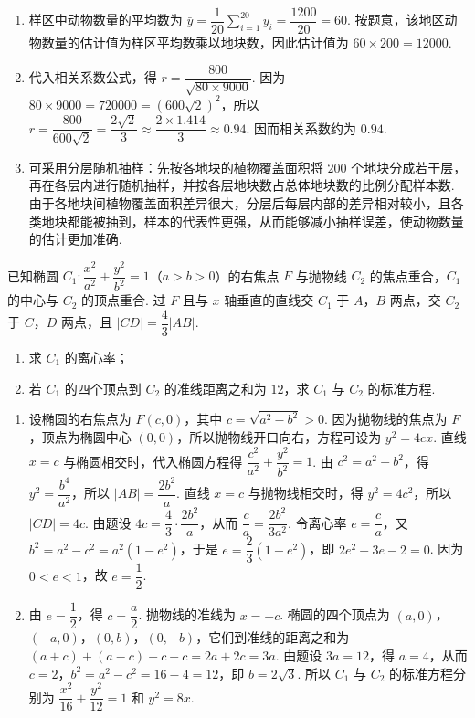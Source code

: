 \begin{solution}
\begin{enumerate}
\item 样区中动物数量的平均数为 \(\bar y=\dfrac1{20}\sum_{i=1}^{20}y_i=\dfrac{1200}{20}=60\). 按题意，该地区动物数量的估计值为样区平均数乘以地块数，因此估计值为 \(60\times200=12000\).
\item 代入相关系数公式，得 \(r=\dfrac{800}{\sqrt{80\times9000}}\). 因为 \(80\times9000=720000=(600\sqrt2)^2\)，所以 \(r=\dfrac{800}{600\sqrt2}=\dfrac{2\sqrt2}{3}\approx\dfrac{2\times1.414}{3}\approx0.94\). 因而相关系数约为 \(0.94\).
\item 可采用分层随机抽样：先按各地块的植物覆盖面积将 \(200\) 个地块分成若干层，再在各层内进行随机抽样，并按各层地块数占总体地块数的比例分配样本数. 由于各地块间植物覆盖面积差异很大，分层后每层内部的差异相对较小，且各类地块都能被抽到，样本的代表性更强，从而能够减小抽样误差，使动物数量的估计更加准确.
\end{enumerate}
\end{solution}

\begin{problem}
已知椭圆 \(C_1:\dfrac{x^2}{a^2}+\dfrac{y^2}{b^2}=1\)（\(a>b>0\)）的右焦点 \(F\) 与抛物线 \(C_2\) 的焦点重合，\(C_1\) 的中心与 \(C_2\) 的顶点重合. 过 \(F\) 且与 \(x\) 轴垂直的直线交 \(C_1\) 于 \(A\)，\(B\) 两点，交 \(C_2\) 于 \(C\)，\(D\) 两点，且 \(\lvert CD\rvert=\dfrac{4}{3}\lvert AB\rvert\).

\begin{enumerate}
\item 求 \(C_1\) 的离心率；
\item 若 \(C_1\) 的四个顶点到 \(C_2\) 的准线距离之和为 \(12\)，求 \(C_1\) 与 \(C_2\) 的标准方程.
\end{enumerate}
\end{problem}

\begin{solution}
\begin{enumerate}
\item 设椭圆的右焦点为 \(F(c,0)\)，其中 \(c=\sqrt{a^2-b^2}>0\). 因为抛物线的焦点为 \(F\)，顶点为椭圆中心 \((0,0)\)，所以抛物线开口向右，方程可设为 \(y^2=4cx\). 直线 \(x=c\) 与椭圆相交时，代入椭圆方程得 \(\dfrac{c^2}{a^2}+\dfrac{y^2}{b^2}=1\). 由 \(c^2=a^2-b^2\)，得 \(y^2=\dfrac{b^4}{a^2}\)，所以 \(\lvert AB\rvert=\dfrac{2b^2}{a}\). 直线 \(x=c\) 与抛物线相交时，得 \(y^2=4c^2\)，所以 \(\lvert CD\rvert=4c\). 由题设 \(4c=\dfrac43\cdot\dfrac{2b^2}{a}\)，从而 \(\dfrac ca=\dfrac{2b^2}{3a^2}\). 令离心率 \(e=\dfrac ca\)，又 \(b^2=a^2-c^2=a^2(1-e^2)\)，于是 \(e=\dfrac23(1-e^2)\)，即 \(2e^2+3e-2=0\). 因为 \(0<e<1\)，故 \(e=\dfrac12\).
\item 由 \(e=\dfrac12\)，得 \(c=\dfrac a2\). 抛物线的准线为 \(x=-c\). 椭圆的四个顶点为 \((a,0)\)，\((-a,0)\)，\((0,b)\)，\((0,-b)\)，它们到准线的距离之和为 \((a+c)+(a-c)+c+c=2a+2c=3a\). 由题设 \(3a=12\)，得 \(a=4\)，从而 \(c=2\)，\(b^2=a^2-c^2=16-4=12\)，即 \(b=2\sqrt3\). 所以 \(C_1\) 与 \(C_2\) 的标准方程分别为 \(\dfrac{x^2}{16}+\dfrac{y^2}{12}=1\) 和 \(y^2=8x\).
\end{enumerate}
\end{solution}

